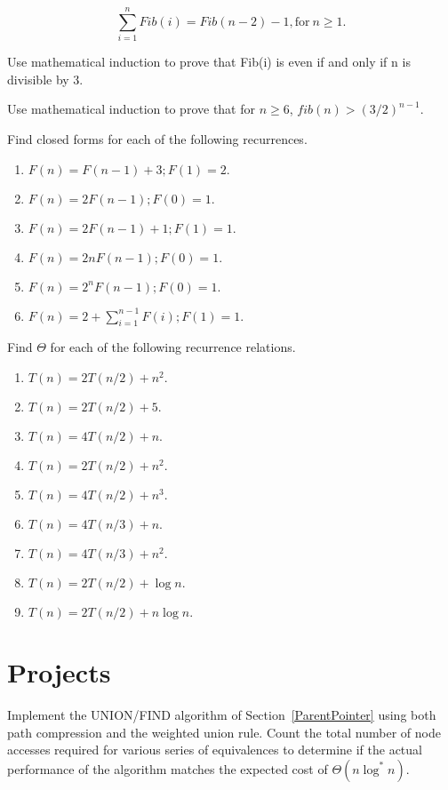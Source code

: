 \begin{exercises}
\[\sum_{i=1}^n Fib(i) = Fib(n-2) - 1, \mbox{for}\ n \geq 1.\]

\item
Use mathematical induction to prove that Fib(i) is even if and only if
n is divisible by 3.

\item
Use mathematical induction to prove that for $n \geq 6$,
$fib(n) > (3/2)^{n-1}$.

\item
Find closed forms for each of the following recurrences.

\begin{enumerate}
\item $F(n) = F(n-1) + 3; F(1) = 2.$
\item $F(n) = 2F(n-1); F(0) = 1.$
\item $F(n) = 2F(n-1) + 1; F(1) = 1.$
\item $F(n) = 2nF(n-1); F(0) = 1.$
\item $F(n) = 2^{n}F(n-1); F(0) = 1.$
\item $F(n) = 2 + \sum_{i=1}^{n-1} F(i); F(1) = 1.$
\end{enumerate}

\item
Find $\Theta$ for each of the following recurrence relations.
\begin{enumerate}
\item $T(n) = 2T(n/2) + n^2.$
\item $T(n) = 2T(n/2) + 5.$
\item $T(n) = 4T(n/2) + n.$
\item $T(n) = 2T(n/2) + n^2.$
\item $T(n) = 4T(n/2) + n^3.$
\item $T(n) = 4T(n/3) + n.$
\item $T(n) = 4T(n/3) + n^2.$
\item $T(n) = 2T(n/2) + \log n.$
\item $T(n) = 2T(n/2) + n \log n.$
\end{enumerate}
\end{exercises}

\section{Projects}

\begin{projects}

\item
Implement the UNION/FIND algorithm
of Section~\ref{ParentPointer}
using both path compression and the
weighted union rule.
Count the total number of node accesses required for various series of
equivalences to determine if the actual performance of the algorithm
matches the expected cost of $\Theta(n \log^* n)$.

\end{projects}
